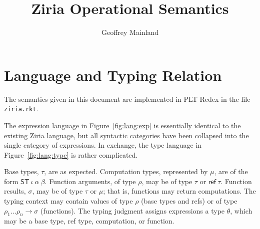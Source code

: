 \documentclass[twocolumn]{article}
\title{Ziria Operational Semantics}
\author{Geoffrey Mainland}
\newcommand{\kw}[1]{\textsf{#1}}
\begin{document}
\maketitle

\section{Language and Typing Relation}

The semantics given in this document are implemented in PLT Redex in the file \texttt{ziria.rkt}.

The expression language in Figure~\ref{fig:lang:exp} is essentially identical to the
existing Ziria language, but all syntactic categories have been collapsed into
the single category of expressions. In exchange, the type language in
Figure~\ref{fig:lang:type} is rather complicated.

Base types, $\tau$, are as expected. Computation types, represented by $\mu$,
are of the form $\kw{ST}~ \iota~ \alpha~ \beta$. Function arguments, of type
$\rho$, may be of type $\tau$ or $\kw{ref}~ \tau$. Function results, $\sigma$,
may be of type $\tau$ or $\mu$; that is, functions may return
computations. The typing context may contain values of type $\rho$ (base types
and refs) or of type $\rho_1 \ldots \rho_n \to \sigma$ (functions). The typing
judgment assigns expressions a type $\theta$, which may be a base type, ref
type, computation, or function.
\end{document}
